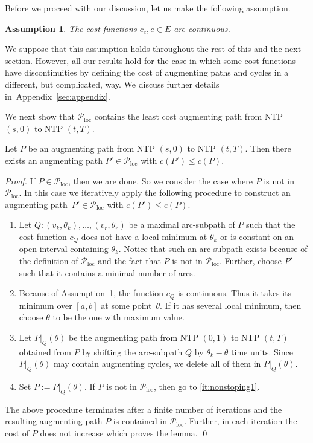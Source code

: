 \documentclass{svjour3}                     \smartqed
\newtheorem{asum}{Assumption}
\newcommand{\loc}{\ensuremath{\text{loc}}}
\begin{document}
Before we proceed with our discussion, let us make the following assumption.
\begin{asum}
\label{asum:cost}
The cost functions $c_e, e\in E$ are continuous.
\end{asum}
We suppose that this assumption holds throughout the rest of this and the next section. However, all our results hold for the case in which some cost functions have discontinuities by defining the cost of augmenting paths and cycles in a different, but complicated, way. We discuss further details in~Appendix~\ref{sec:appendix}.

We next show that $\mathcal{P}_{\loc}$ contains the least cost augmenting path from NTP $(s,0)$ to NTP $(t,T)$.

\begin{lemma}
\label{lem:path-exists-sink}
Let $P$ be an augmenting path from NTP $(s,0)$ to NTP $(t,T)$. Then there exists an augmenting path $P'\in\mathcal{P}_{\loc}$ with $c(P')\leq c(P)$.
\end{lemma}
\begin{proof}
If $P\in \mathcal{P}_{\loc}$, then we are done. So we consider the case where $P$ is not in~$\mathcal{P}_{\loc}$. In this case we iteratively apply the following procedure to construct an augmenting path~$P'\in \mathcal{P}_{\loc}$  with $c(P')\leq c(P)$.
\begin{enumerate}[label = (\roman*)]
\item\label{it:nonstoping1}
  Let $Q:(v_k,\theta_k),\ldots,(v_r,\theta_r)$ be a maximal arc-subpath of $P$ such that the cost function $c_{Q}$ does not have a local minimum at $\theta_k$ or is constant on an open interval containing $\theta_k$. Notice that such an arc-subpath exists because of the definition of $\mathcal{P}_{\loc}$ and the fact that $P$ is not in $\mathcal{P}_{\loc}$. Further, choose $P'$ such that it contains a minimal number of arcs.
\item
  Because of Assumption~\ref{asum:cost}, the function $c_{Q}$ is continuous. Thus it takes its minimum over $[a,b]$ at some point~$\theta$. If it has several local minimum, then choose $\theta$ to be the one with maximum value.
\item
  Let $P|_{Q}(\theta)$ be the augmenting path from NTP $(0,1)$ to NTP $(t,T)$ obtained from $P$ by shifting the arc-subpath $Q$ by $\theta_k-\theta$ time units. Since $P|_{Q}(\theta)$ may contain augmenting cycles, we delete all of them in $P|_{Q}(\theta)$.
\item\label{it:nonstoping2} Set $P:=P|_{Q}(\theta)$. If $P$ is not in $\mathcal{P}_{\loc}$, then go to \ref{it:nonstoping1}.
\end{enumerate}
The above procedure terminates after a finite number of iterations and the resulting augmenting path $P$ is contained in $\mathcal{P}_{\loc}$. Further, in each iteration the cost of $P$ does not increase which proves the lemma.
\qed\end{proof}
\end{document}
